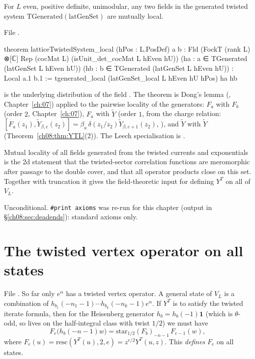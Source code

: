 \begin{theorem}\label{ch08:thm:system}
For $L$ even, positive definite, unimodular, any two fields in the generated twisted system
$\mathrm{TGenerated}(\text{latGenSet})$ are mutually local.
\end{theorem}
\noindent File .
\begin{leancode}
theorem latticeTwistedSystem_local (hPos : L.PosDef)
    {a b : Fld (FockT (rank L) ⊗[ℂ] Rep (cocMat L) (isUnit_det_cocMat L hEven hU))}
    (ha : a ∈ TGenerated (latGenSet L hEven hU)) (hb : b ∈ TGenerated (latGenSet L hEven hU)) :
    Local a.1 b.1 :=
  tgenerated_local (latGenSet_local L hEven hU hPos) ha hb
\end{leancode}
\begin{dictionary}
 is the underlying distribution of the field .  The theorem is Dong's lemma
(, Chapter~\ref{ch:07}) applied to the pairwise locality of the generators:
$F_a$ with $F_b$ (order $2$, Chapter~\ref{ch:07}), $F_a$ with $\widetilde Y$ (order $1$, from the
charge relation: $[F_a(z_1),\widetilde Y_{\beta,e}(z_2)]=\beta_a\,\delta(z_1/z_2)\widetilde
Y_{\beta,e+1}(z_2)$, ), and $\widetilde Y$ with $\widetilde Y$
(Theorem~\ref{ch08:thm:YTL}(2)).  The Leech specialisation is .
\end{dictionary}

\begin{physics}
Mutual locality of all fields generated from the twisted currents and exponentials is the 2d statement that the twisted-sector correlation functions are meromorphic after passage to the double cover, and that all operator products close on this set. Together with truncation it gives the field-theoretic input for defining $Y^T$ on all of $V_L$.
\end{physics}
\begin{status}
Unconditional.  \texttt{\#print axioms}  was re-run for this chapter
(output in \S\ref{ch08:sec:deadends}): standard axioms only.
\end{status}

\section{The twisted vertex operator on all states}\label{ch08:sec:allstates}

File .  So far only $e^\alpha$ has a twisted
vertex operator.  A general state of $V_L$ is a combination of $h_{b_1}(-n_1-1)\cdots
h_{b_k}(-n_k-1)e^\alpha$.  If $Y^T$ is to satisfy the twisted iterate formula, then for the
Heisenberg generator $h_b=h_b(-1)\mathbf 1$ (which is $\theta$-odd, so lives on the half-integral
class with twist $1/2$) we must have
\begin{equation}\label{ch08:eq:creation}
  F_e\bigl(h_b(-n-1)w\bigr)=\mathrm{star}_{1/2}(F_b)_{-n-1}\,F_{e-1}(w),
\end{equation}
where $F_e(u)=\mathrm{resc}(Y^T(u),2,e)=z^{e/2}Y^T(u,z)$.  This \emph{defines} $F_e$ on all states.

